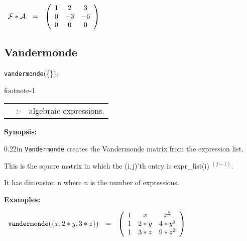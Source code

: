 \vspace*{0.1in}

\begin{flushleft}
\hspace*{0.1in}
\begin{math}
\begin{array}{ccc}
{\cal F} * {\cal A} & = &
\left( \begin{array}{ccc} 1 & 2 & 3 \\ 0 & -3 & -6 \\ 0 & 0 & 0
\end{array} \right)
\end{array}
\end{math}
\end{flushleft}

\subsection{Vandermonde}


\hspace*{0.175in} {\tt vandermonde}(\{\exprlist{}\}); \addtocounter
{footnote}{-1}\footnotemark

\hspace*{0.1in} 
\begin{tabular}{l l l}
\exprlist{} &:-& algebraic expressions.
\end{tabular}

{\bf Synopsis:} %

\begin{addtolength}{\leftskip}{0.22in}
{\tt Vandermonde} creates the Vandermonde matrix from
                the expression list. 

This is the square matrix in which
                the (i,$\,$j)'th entry is expr\_list(i) $^{(j-1)}$.

It has dimension n where n is the number of expressions.

\end{addtolength}

{\bf Examples:}

\begin{flushleft}  
\hspace*{0.1in}
\begin{math}  
\begin{array}{ccc}
{\tt vandermonde}(\{x,2*y,3*z\}) & = & 
        \left( \begin{array}{ccc} 1 & x & x^2 \\ 1 & 2*y & 4*y^2 \\ 1 
& 3*z & 9*z^2 
 \end{array} \right) 
\end{array}
\end{math}  
\end{flushleft}

